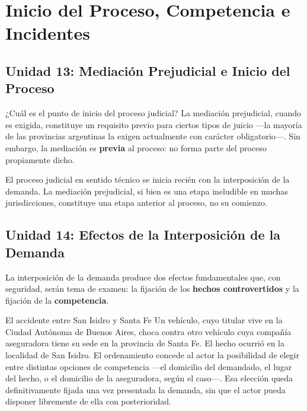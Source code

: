 \documentclass[12pt,oneside]{book}
\begin{document}

\chapter{Inicio del Proceso, Competencia e Incidentes}

\section{Unidad 13: Mediación Prejudicial e Inicio del Proceso}

¿Cuál es el punto de inicio del proceso judicial? La mediación prejudicial, cuando es exigida, constituye un requisito previo para ciertos tipos de juicio ---la mayoría de las provincias argentinas la exigen actualmente con carácter obligatorio---. Sin embargo, la mediación es \textbf{previa} al proceso: no forma parte del proceso propiamente dicho.

\begin{important}
El proceso judicial en sentido técnico se inicia recién con la interposición de la demanda. La mediación prejudicial, si bien es una etapa ineludible en muchas jurisdicciones, constituye una etapa anterior al proceso, no su comienzo.
\end{important}

\section{Unidad 14: Efectos de la Interposición de la Demanda}

La interposición de la demanda produce dos efectos fundamentales que, con seguridad, serán tema de examen: la fijación de los \textbf{hechos controvertidos} y la fijación de la \textbf{competencia}.

\begin{example}{El accidente entre San Isidro y Santa Fe}
Un vehículo, cuyo titular vive en la Ciudad Autónoma de Buenos Aires, choca contra otro vehículo cuya compañía aseguradora tiene su sede en la provincia de Santa Fe. El hecho ocurrió en la localidad de San Isidro. El ordenamiento concede al actor la posibilidad de elegir entre distintas opciones de competencia ---el domicilio del demandado, el lugar del hecho, o el domicilio de la aseguradora, según el caso---. Esa elección queda definitivamente fijada una vez presentada la demanda, sin que el actor pueda disponer libremente de ella con posterioridad.
\end{example}
\end{document}
